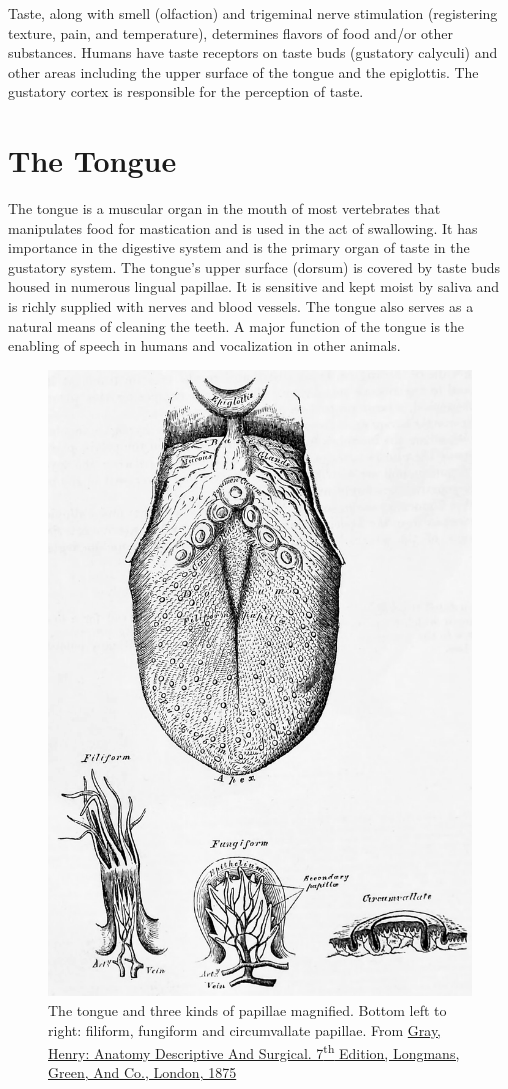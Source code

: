 Taste, along with smell (olfaction) and trigeminal nerve stimulation (registering texture, pain, and temperature), determines flavors of food and/or other substances. Humans have taste receptors on taste buds (gustatory calyculi) and other areas including the upper surface of the tongue and the epiglottis. The gustatory cortex is responsible for the perception of taste.

\hypertarget{the-tongue}{%
\section{The Tongue}\label{the-tongue}}

The tongue is a muscular organ in the mouth of most vertebrates that manipulates food for mastication and is used in the act of swallowing. It has importance in the digestive system and is the primary organ of taste in the gustatory system. The tongue's upper surface (dorsum) is covered by taste buds housed in numerous lingual papillae. It is sensitive and kept moist by saliva and is richly supplied with nerves and blood vessels. The tongue also serves as a natural means of cleaning the teeth. A major function of the tongue is the enabling of speech in humans and vocalization in other animals.



\begin{figure}

{\centering \includegraphics[width=0.7\linewidth]{./figures/gustatory/tongue} 

}

\caption{The tongue and three kinds of papillae magnified. Bottom left to right: filiform, fungiform and circumvallate papillae. From \href{https://wellcomelibrary.org/item/b21688692}{Gray, Henry: Anatomy Descriptive And Surgical. 7\textsuperscript{th} Edition, Longmans, Green, And Co., London, 1875}}\label{fig:tongue}
\end{figure}

